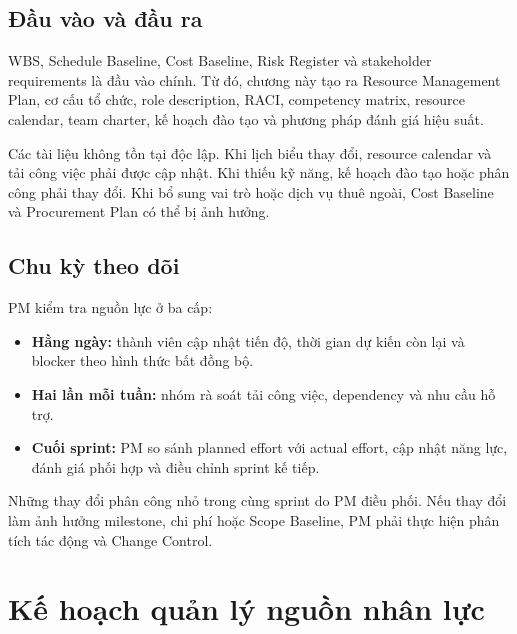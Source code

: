 
\subsection{Đầu vào và đầu ra}

WBS, Schedule Baseline, Cost Baseline, Risk Register và stakeholder requirements là đầu vào chính. Từ đó, chương này tạo ra Resource Management Plan, cơ cấu tổ chức, role description, RACI, competency matrix, resource calendar, team charter, kế hoạch đào tạo và phương pháp đánh giá hiệu suất.

Các tài liệu không tồn tại độc lập. Khi lịch biểu thay đổi, resource calendar và tải công việc phải được cập nhật. Khi thiếu kỹ năng, kế hoạch đào tạo hoặc phân công phải thay đổi. Khi bổ sung vai trò hoặc dịch vụ thuê ngoài, Cost Baseline và Procurement Plan có thể bị ảnh hưởng.

\subsection{Chu kỳ theo dõi}

PM kiểm tra nguồn lực ở ba cấp:

\begin{itemize}
  \item \textbf{Hằng ngày:} thành viên cập nhật tiến độ, thời gian dự kiến còn lại và blocker theo hình thức bất đồng bộ.
  \item \textbf{Hai lần mỗi tuần:} nhóm rà soát tải công việc, dependency và nhu cầu hỗ trợ.
  \item \textbf{Cuối sprint:} PM so sánh planned effort với actual effort, cập nhật năng lực, đánh giá phối hợp và điều chỉnh sprint kế tiếp.
\end{itemize}

Những thay đổi phân công nhỏ trong cùng sprint do PM điều phối. Nếu thay đổi làm ảnh hưởng milestone, chi phí hoặc Scope Baseline, PM phải thực hiện phân tích tác động và Change Control.

\fi
\section{Kế hoạch quản lý nguồn nhân lực}

